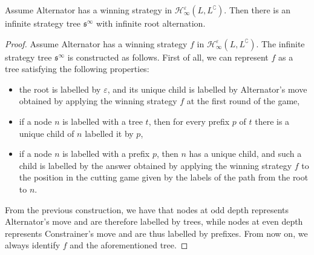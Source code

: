 \begin{proposition}\label{prop:types}
 Assume Alternator has a winning strategy in  $\mathcal{H}^\varepsilon_\infty(L, L^\complement)$. Then there is an infinite strategy tree $\mathfrak{s}^\infty$ with infinite root alternation. 
\end{proposition} 
 \begin{proof}
 Assume Alternator has a winning strategy $f$ in  $\mathcal{H}^\varepsilon_\infty(L, L^\complement)$. The infinite strategy tree $\mathfrak{s}^\infty$ is constructed as follows. First of all, we can represent $f$ as a tree satisfying the following properties:
\begin{itemize}
\item the root is labelled by $\varepsilon$, and its unique child is labelled by Alternator's move obtained by applying the winning strategy $f$ at the first round of the game,
\item if a node $n$ is labelled with a tree $t$, then for every prefix $p$ of $t$ there is a unique child of $n$ labelled it by $p$,
\item if a node $n$ is labelled with a prefix $p$, then $n$ has a unique child, and such a child is labelled by the answer obtained by applying the winning strategy $f$ to the position in the cutting game given by the  labels of the path from the root to $n$.
\end{itemize}
From the previous construction, we have that nodes at odd depth represents Alternator's move and are therefore labelled by trees, while nodes at even depth represents Constrainer's move and are thus labelled by prefixes. From now on, we always identify $f$ and the aforementioned  tree.



\end{proof}
